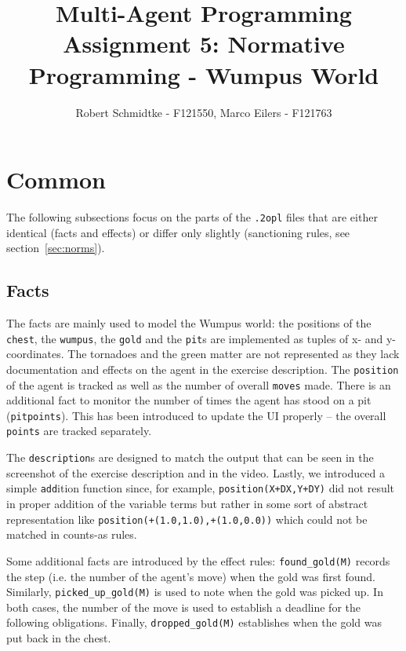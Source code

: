 \documentclass[a4paper,11pt]{article}
\begin{document}
\title{Multi-Agent Programming\\Assignment 5: Normative Programming - Wumpus World}
\author{Robert Schmidtke - F121550, Marco Eilers - F121763}

\maketitle
\newpage

\section{Common}
\label{sec:common}
The following subsections focus on the parts of the \texttt{.2opl} files that are either identical (facts and effects) or differ only slightly (sanctioning rules, see section~\ref{sec:norms}).

\subsection{Facts}
\label{sec:facts}
The facts are mainly used to model the Wumpus world: the positions of the \texttt{chest}, the \texttt{wumpus}, the \texttt{gold} and the \texttt{pit}s are implemented as tuples of x- and y-coordinates. The tornadoes and the green matter are not represented as they lack documentation and effects on the agent in the exercise description. The \texttt{position} of the agent is tracked as well as the number of overall \texttt{moves} made. There is an additional fact to monitor the number of times the agent has stood on a pit (\texttt{pitpoints}). This has been introduced to update the UI properly -- the overall \texttt{points} are tracked separately.

The \texttt{description}s are designed to match the output that can be seen in the screenshot of the exercise description and in the video. Lastly, we introduced a simple \texttt{add}ition function since, for example, \texttt{position(X+DX,Y+DY)} did not result in proper addition of the variable terms but rather in some sort of abstract representation like \texttt{position(+(1.0,1.0),+(1.0,0.0))} which could not be matched in counts-as rules.

Some additional facts are introduced by the effect rules: \texttt{found\_gold(M)} records the step (i.e. the number of the agent's move) when the gold was first found. Similarly, \texttt{picked\_up\_gold(M)} is used to note when the gold was picked up. In both cases, the number of the move is used to establish a deadline for the following obligations. Finally, \texttt{dropped\_gold(M)} establishes when the gold was put back in the chest. 
\end{document}
